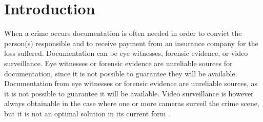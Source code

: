 \chapter{Introduction}
\label{chap:introduction}


When a crime occurs documentation is often needed in order to convict the person(s) responsible and to receive payment from an insurance company for the loss suffered.
Documentation can be eye witnesses, forensic evidence, or video surveillance.
Eye witnesses or forensic evidence are unreliable sources for documentation, since it is not possible to guarantee they will be available.
Documentation from eye witnesses or forensic evidence are unreliable sources, as it is not possible to guarantee it will be available.
Video surveillance is however always obtainable in the case where one or more cameras surveil the crime scene, but it is not an optimal solution in its current form \citep{whats-wrong-public-video-surveillance}.








